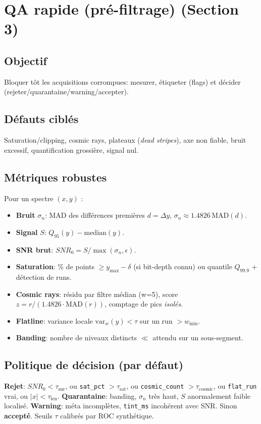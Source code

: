 
\section{QA rapide (pré-filtrage) (Section 3)}

\subsection{Objectif}
Bloquer tôt les acquisitions corrompues: mesurer, étiqueter (flags) et décider (rejeter/quarantaine/warning/accepter).

\subsection{Défauts ciblés}
Saturation/clipping, cosmic rays, plateaux (\emph{dead stripes}), axe non fiable, bruit excessif, quantification grossière, signal nul.

\subsection{Métriques robustes}
Pour un spectre $(x,y)$ :
\begin{itemize}[nosep]
\item \textbf{Bruit} $\sigma_n$: MAD des différences premières $d=\Delta y$, $\sigma_n \approx 1.4826\,\mathrm{MAD}(d)$.
\item \textbf{Signal} $S$: $Q_{95}(y)-\mathrm{median}(y)$.
\item \textbf{SNR brut}: $SNR_0 = S / \max(\sigma_n, \epsilon)$.
\item \textbf{Saturation}: \% de points $\ge y_{\max}-\delta$ (si bit-depth connu) ou quantile $Q_{99.9}$ + détection de runs.
\item \textbf{Cosmic rays}: résidu par filtre médian (w=5), score $z=r/(1.4826\cdot \mathrm{MAD}(r))$, comptage de pics \emph{isolés}.
\item \textbf{Flatline}: variance locale $\mathrm{var}_w(y) < \tau$ sur un run $> w_{\min}$.
\item \textbf{Banding}: nombre de niveaux distincts $\ll$ attendu sur un sous-segment.
\end{itemize}

\subsection{Politique de décision (par défaut)}
\textbf{Rejet}: $SNR_0 < \tau_{\mathrm{snr}}$, ou \texttt{sat\_pct} $> \tau_{\mathrm{sat}}$, ou \texttt{cosmic\_count} $> \tau_{\mathrm{cosmic}}$, ou \texttt{flat\_run} vrai, ou $|x|<\tau_{\mathrm{len}}$.
\textbf{Quarantaine}: banding, $\sigma_n$ très haut, $S$ anormalement faible localisé.
\textbf{Warning}: méta incomplètes, \texttt{tint\_ms} incohérent avec SNR.
Sinon \textbf{accepté}. Seuils $\tau$ calibrés par ROC synthétique.

